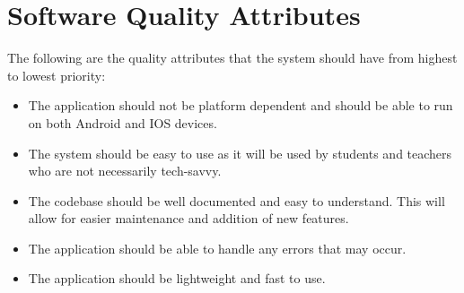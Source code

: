 \documentclass{scrreprt}
\begin{document}
\section{Software Quality Attributes}
The following are the quality attributes that the system should have from highest to lowest priority:
\begin{itemize}
    \item The application should not be platform dependent and should be able to run on both Android and IOS devices.
    \item The system should be easy to use as it will be used by students and teachers who are not necessarily tech-savvy.
    \item The codebase should be well documented and easy to understand. This will allow for easier maintenance and addition of new features.
    \item The application should be able to handle any errors that may occur.
    \item The application should be lightweight and fast to use.
\end{itemize}



\end{document}
